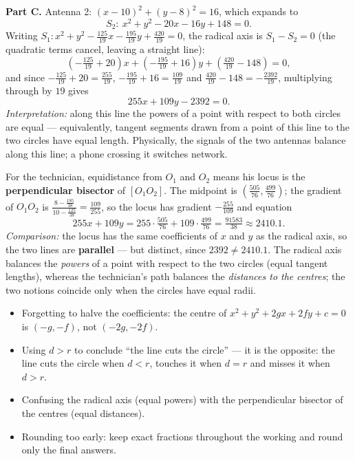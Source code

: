 \documentclass[11pt]{article}
\begin{document}
\textbf{Part C.} Antenna 2: $(x-10)^{2}+(y-8)^{2}=16$, which expands to
\[ S_{2}:\ x^{2}+y^{2}-20x-16y+148=0. \]
Writing $S_{1}: x^{2}+y^{2}-\tfrac{125}{19}x-\tfrac{195}{19}y+\tfrac{420}{19}=0$, the radical axis is $S_{1}-S_{2}=0$ (the quadratic terms cancel, leaving a straight line):
\[ \left(-\tfrac{125}{19}+20\right)x+\left(-\tfrac{195}{19}+16\right)y+\left(\tfrac{420}{19}-148\right)=0, \]
and since $-\tfrac{125}{19}+20=\tfrac{255}{19}$, $-\tfrac{195}{19}+16=\tfrac{109}{19}$ and $\tfrac{420}{19}-148=-\tfrac{2392}{19}$, multiplying through by $19$ gives
\[ 255x+109y-2392=0. \]
\emph{Interpretation:} along this line the powers of a point with respect to both circles are equal — equivalently, tangent segments drawn from a point of this line to the two circles have equal length. Physically, the signals of the two antennas balance along this line; a phone crossing it switches network.

For the technician, equidistance from $O_{1}$ and $O_{2}$ means his locus is the \textbf{perpendicular bisector} of $[O_{1}O_{2}]$. The midpoint is $\left(\tfrac{505}{76},\tfrac{499}{76}\right)$; the gradient of $O_{1}O_{2}$ is $\tfrac{8-\frac{195}{38}}{10-\frac{125}{38}}=\tfrac{109}{255}$, so the locus has gradient $-\tfrac{255}{109}$ and equation
\[ 255x+109y=255\cdot\tfrac{505}{76}+109\cdot\tfrac{499}{76}=\tfrac{91583}{38}\approx 2410.1. \]
\emph{Comparison:} the locus has the same coefficients of $x$ and $y$ as the radical axis, so the two lines are \textbf{parallel} — but distinct, since $2392\neq 2410.1$. The radical axis balances the \emph{powers} of a point with respect to the two circles (equal tangent lengths), whereas the technician's path balances the \emph{distances to the centres}; the two notions coincide only when the circles have equal radii.

\begin{attention}
\begin{itemize}
\item Forgetting to halve the coefficients: the centre of $x^{2}+y^{2}+2gx+2fy+c=0$ is $(-g,-f)$, not $(-2g,-2f)$.
\item Using $d>r$ to conclude ``the line cuts the circle'' — it is the opposite: the line cuts the circle when $d<r$, touches it when $d=r$ and misses it when $d>r$.
\item Confusing the radical axis (equal powers) with the perpendicular bisector of the centres (equal distances).
\item Rounding too early: keep exact fractions throughout the working and round only the final answers.
\end{itemize}
\end{attention}
\end{document}
